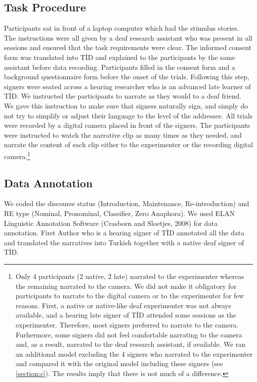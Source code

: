 \documentclass[]{elsarticle} %
\begin{document}
\hypertarget{task-procedure}{%
\subsection{Task Procedure}\label{task-procedure}}

Participants sat in front of a laptop computer which had the stimulus
stories. The instructions were all given by a deaf research assistant
who was present in all sessions and ensured that the task requirements
were clear. The informed consent form was translated into TİD and
explained to the participants by the same assistant before data
recording. Participants filled in the consent form and a background
questionnaire form before the onset of the trials. Following this step,
signers were seated across a hearing researcher who is an advanced late
learner of TİD. We instructed the participants to narrate as they would
to a deaf friend. We gave this instruction to make sure that signers
naturally sign, and simply do not try to simplify or adjust their
language to the level of the addressee. All trials were recorded by a
digital camera placed in front of the signers. The participants were
instructed to watch the narrative clip as many times as they needed, and
narrate the content of each clip either to the experimenter or the
recording digital
camera.\footnote{Only 4 participants (2 native, 2 late) narrated to the experimenter whereas the remaining narrated to the camera. We did not make it obligatory for participants to  narrate to the digital camera or to the experimenter for few reasons. First, a native or native-like deaf experimenter was not always available, and a hearing late signer of TİD attended some sessions as the experimenter. Therefore, most signers preferred to narrate to the camera. Furhermore, some signers did not feel comfortable narrating to the camera and, as a result, narrated to the deaf research assistant, if available. We ran an additional model excluding the 4 signers who narrated to the experimenter and compared it with the original model including these signers (see \ref{section:c}). The results imply that there is not much of a difference.}

\hypertarget{data-annotation}{%
\subsection{Data Annotation}\label{data-annotation}}

We coded the discourse status (Introduction, Maintenance,
Re-introduction) and RE type (Nominal, Pronominal, Classifier, Zero
Anaphora). We used ELAN Linguistic Annotation Software (Crasborn and
Sloetjes, 2008) for data annotation. First Author who is a hearing
signer of TİD annotated all the data and translated the narratives into
Turkish together with a native deaf signer of TİD.
\end{document}
